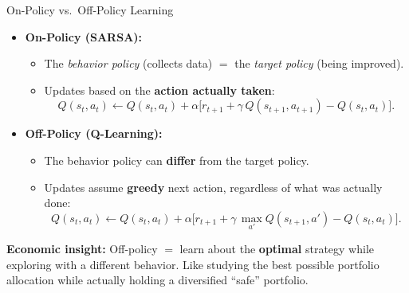 \documentclass[10pt,english,aspectratio=169]{beamer}
\begin{document}
\begin{frame}{On-Policy vs.\ Off-Policy Learning}
    \begin{itemize}
        \item \textbf{On-Policy (SARSA):}
        \begin{itemize}
            \item The \emph{behavior policy} (collects data) $=$ the \emph{target policy} (being improved).
            \item Updates based on the \textbf{action actually taken}:
            \[
              Q(s_t, a_t) \leftarrow Q(s_t,a_t) + \alpha \bigl[r_{t+1} + \gamma\,Q(s_{t+1}, a_{t+1}) - Q(s_t,a_t)\bigr].
            \]
        \end{itemize}

        \vspace{0.2cm}
        \item \textbf{Off-Policy (Q-Learning):}
        \begin{itemize}
            \item The behavior policy can \textbf{differ} from the target policy.
            \item Updates assume \textbf{greedy} next action, regardless of what was actually done:
            \[
              Q(s_t, a_t) \leftarrow Q(s_t,a_t) + \alpha \bigl[r_{t+1} + \gamma\,\max_{a'} Q(s_{t+1}, a') - Q(s_t,a_t)\bigr].
            \]
        \end{itemize}
    \end{itemize}

    \vspace{0.3cm}
    \textbf{Economic insight:} Off-policy $=$ learn about the \textbf{optimal} strategy while exploring with a different behavior. Like studying the best possible portfolio allocation while actually holding a diversified ``safe'' portfolio.
\end{frame}
\end{document}
